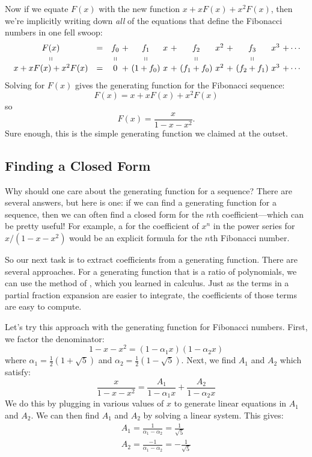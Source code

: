 Now if we equate $F(x)$ with the new function $x + x F(x) + x^2 F(x)$,
then we're implicitly writing down \emph{all} of the equations that
define the Fibonacci numbers in one fell swoop:
%
\[
\begin{array}{ccc@{\ }c@{\ }c@{\ }c@{\ }c@{\ }c@{\ }c@{\ }c@{\ }c@{\ }c@{\ }c@{\ }c@{\ }c}
F(x)
    & = & f_0 & + & f_1 & x & + & f_2 & x^2 & + & f_3 & x^3 & + \cdots \\
\shortparallel && \shortparallel && \shortparallel &&& \shortparallel &&& \shortparallel\\
x + x F(x) + x^2 F(x)
    & = & 0 & + & (1 + f_0) & x & + & (f_1 + f_0) & x^2 & + & (f_2 + f_1) & x^3 & + \cdots
\end{array}
\]
%
Solving for $F(x)$ gives the generating function for the Fibonacci
sequence:
%
\[
F(x)  = x + x F(x) + x^2 F(x)
\]
so
\[
F(x) = \frac{x}{1 - x - x^2}.
\]
%
Sure enough, this is the simple generating function we claimed at the
outset.

\subsection{Finding a Closed Form}

Why should one care about the generating function for a sequence?  There
are several answers, but here is one: if we can find a generating function
for a sequence, then we can often find a closed form for the $n$th
coefficient---which can be pretty useful!  For example, a  for the coefficient of $x^n$ in the power series for $x / (1 - x -
x^2)$ would be an explicit formula for the $n$th Fibonacci number.

So our next task is to extract coefficients from a generating function.
There are several approaches.  For a generating function that is a ratio
of polynomials, we can use the method of , which
you learned in calculus.  Just as the terms in a partial fraction
expansion are easier to integrate, the coefficients of those terms are
easy to compute.

Let's try this approach with the generating function for Fibonacci
numbers.  First, we factor the denominator:
%
\[
1 - x - x^2 = (1 - \alpha_1 x) (1 - \alpha_2 x)
\]
%
where $\alpha_1 = \frac{1}{2}(1 + \sqrt{5})$ and $\alpha_2 =
\frac{1}{2}(1 - \sqrt{5})$.  Next, we find $A_1$ and $A_2$ which
satisfy:
%
\[
\frac{x}{1 - x - x^2} =
        \frac{A_1}{1 - \alpha_1 x} + \frac{A_2}{1 - \alpha_2 x}
\]
%
We do this by plugging in various values of $x$ to generate linear
equations in $A_1$ and $A_2$.  We can then find $A_1$ and $A_2$ by
solving a linear system.  This gives:
%
\begin{gather*}
A_1 = \frac{1}{\alpha_1 - \alpha_2} = \frac{1}{\sqrt{5}} \\
A_2 = \frac{-1}{\alpha_1 - \alpha_2} = -\frac{1}{\sqrt{5}}
\end{gather*}

